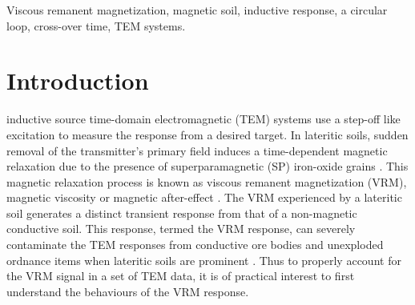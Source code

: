 \documentclass[journal]{IEEEtran}  %
\begin{document}
\begin{IEEEkeywords}
Viscous remanent magnetization, magnetic soil, inductive response, a circular loop, cross-over time, TEM systems.
\end{IEEEkeywords}




\section{Introduction}
 inductive source time-domain electromagnetic (TEM) systems use a step-off like excitation to measure the response from a desired target. In lateritic soils, sudden removal of the transmitter's primary field induces a time-dependent magnetic relaxation due to the presence of superparamagnetic (SP) iron-oxide grains \cite{Buselli1982, Barsukov2001,Billings2003,Pasion2007,Zadorozhnaya2012}. This magnetic relaxation process is known as viscous remanent magnetization (VRM), magnetic viscosity or magnetic after-effect \cite{Dabas1992,Neel1949,Moskowitz1985}. The VRM experienced by a lateritic soil generates a distinct transient response from that of a non-magnetic conductive soil. This response, termed the VRM response, can severely contaminate the TEM responses from conductive ore bodies and unexploded ordnance items when lateritic soils are prominent \cite{Butler2003, Billings2003,Pasion2007, Buselli1982,Barsukov2001,Zadorozhnaya2012}. Thus to properly account for the VRM signal in a set of TEM data, it is of practical interest to first understand the behaviours of the VRM response.
\end{document}
